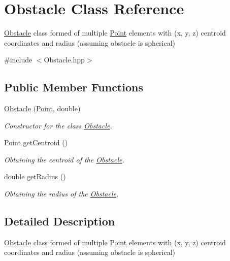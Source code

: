 \hypertarget{classObstacle}{}\section{Obstacle Class Reference}
\label{classObstacle}


\hyperlink{classObstacle}{Obstacle} class formed of multiple \hyperlink{classPoint}{Point} elements with (x, y, z) centroid coordinates and radius (assuming obstacle is spherical)  




{\ttfamily \#include $<$Obstacle.\+hpp$>$}

\subsection*{Public Member Functions}
\begin{DoxyCompactItemize}
\item 
\hyperlink{classObstacle_ad10b66ffc4863610ce47c2e34bcf371b}{Obstacle} (\hyperlink{classPoint}{Point}, double)
\begin{DoxyCompactList}\small\item\em Constructor for the class \hyperlink{classObstacle}{Obstacle}. \end{DoxyCompactList}\item 
\hyperlink{classPoint}{Point} \hyperlink{classObstacle_ae7218a3b249252634c79df36aa80d49f}{get\+Centroid} ()
\begin{DoxyCompactList}\small\item\em Obtaining the centroid of the \hyperlink{classObstacle}{Obstacle}. \end{DoxyCompactList}\item 
double \hyperlink{classObstacle_a541080728d9e96967bdb6cbfd02616ad}{get\+Radius} ()
\begin{DoxyCompactList}\small\item\em Obtaining the radius of the \hyperlink{classObstacle}{Obstacle}. \end{DoxyCompactList}\end{DoxyCompactItemize}


\subsection{Detailed Description}
\hyperlink{classObstacle}{Obstacle} class formed of multiple \hyperlink{classPoint}{Point} elements with (x, y, z) centroid coordinates and radius (assuming obstacle is spherical) 

